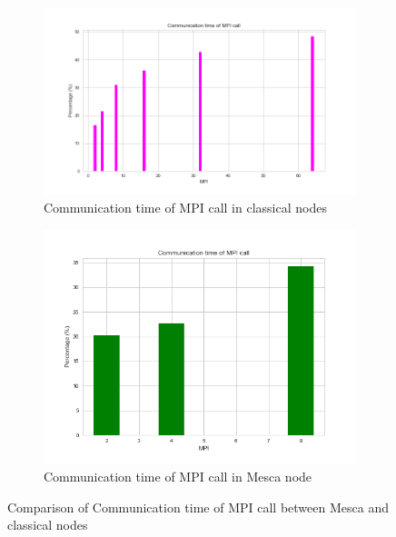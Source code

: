 \begin{figure}[!h]
\centering 
  \begin{subfigure}[b]{0.7\textwidth}
    \includegraphics[width=\textwidth]{images/MPIProfInca.png}
    \caption{Communication time of MPI call in classical nodes}
    \label{MPIProfInca}
  \end{subfigure}
  \begin{subfigure}[b]{0.7\textwidth}
    \includegraphics[width=\textwidth]{images/MPIProfMesc.png}
    \caption{Communication time of MPI call in Mesca node}
    \label{MPIProfMesc}    
  \end{subfigure}
  \caption{Comparison of Communication time of MPI call between Mesca and classical nodes}
\end{figure} 
